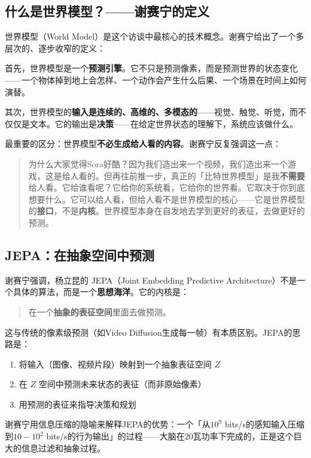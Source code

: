 \documentclass[a4paper]{article}
\begin{document}
\subsection{什么是世界模型？——谢赛宁的定义}

世界模型（World Model）是这个访谈中最核心的技术概念。谢赛宁给出了一个多层次的、逐步收窄的定义：

首先，世界模型是一个\textbf{预测引擎}。它不只是预测像素，而是预测世界的状态变化——一个物体掉到地上会怎样、一个动作会产生什么后果、一个场景在时间上如何演替。

其次，世界模型的\textbf{输入是连续的、高维的、多模态的}——视觉、触觉、听觉，而不仅仅是文本。它的输出是\textbf{决策}——在给定世界状态的理解下，系统应该做什么。

最重要的区分：世界模型\textbf{不必生成给人看的内容}。谢赛宁反复强调这一点：

\begin{quote}
为什么大家觉得Sora好酷？因为我们造出来一个视频，我们造出来一个游戏，这是给人看的。但再往前推一步，真正的「比特世界模型」是我\textbf{不需要}给人看。它给谁看呢？它给你的系统看，它给你的世界看。它取决于你到底想要什么。它可以给人看，但给人看不是世界模型的核心——它是世界模型的\textbf{接口}，不是\textbf{内核}。世界模型本身在自发地去学到更好的表征，去做更好的预测。
\end{quote}

\subsection{JEPA：在抽象空间中预测}

谢赛宁强调，杨立昆的 JEPA（Joint Embedding Predictive Architecture）不是一个具体的算法，而是一个\textbf{思想海洋}。它的内核是：

\begin{quote}
在一个\textbf{抽象的表征空间}里面去做预测。
\end{quote}

这与传统的像素级预测（如Video Diffusion生成每一帧）有本质区别。JEPA的思路是：

\begin{enumerate}
  \item 将输入（图像、视频片段）映射到一个抽象表征空间 $Z$
  \item 在 $Z$ 空间中预测未来状态的表征（而非原始像素）
  \item 用预测的表征来指导决策和规划
\end{enumerate}

谢赛宁用信息压缩的隐喻来解释JEPA的优势：一个「从$10^{9}$ bits/s的感知输入压缩到$10{-}10^{2}$ bits/s的行为输出」的过程——大脑在20瓦功率下完成的，正是这个巨大的信息过滤和抽象过程。
\end{document}
